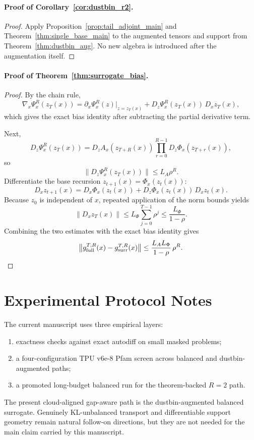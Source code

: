 \documentclass{article}
\begin{document}
\paragraph{Proof of Corollary~\ref{cor:dustbin_r2}.}
\begin{proof}
Apply Proposition~\ref{prop:tail_adjoint_main} and Theorem~\ref{thm:single_base_main} to the augmented tensors and support from Theorem~\ref{thm:dustbin_aug}. No new algebra is introduced after the augmentation itself.
\end{proof}

\paragraph{Proof of Theorem~\ref{thm:surrogate_bias}.}
\begin{proof}
By the chain rule,
\[
\nabla_x\Psi_x^R(z_T(x))
=
\partial_x \Psi_x^R(z)\big|_{z=z_T(x)}
+
D_z\Psi_x^R(z_T(x))\,D_x z_T(x),
\]
which gives the exact bias identity after subtracting the partial derivative term.

Next,
\[
D_z\Psi_x^R(z_T(x))
=
D_z A_x(z_{T+R}(x))
\prod_{r=0}^{R-1} D_z\Phi_x(z_{T+r}(x)),
\]
so
\[
\|D_z\Psi_x^R(z_T(x))\|
\le
L_A \rho^R.
\]
Differentiate the base recursion $z_{t+1}(x)=\Phi_x(z_t(x))$:
\[
D_x z_{t+1}(x)
=
D_x\Phi_x(z_t(x))
+
D_z\Phi_x(z_t(x))\,D_x z_t(x).
\]
Because $z_0$ is independent of $x$, repeated application of the norm bounds yields
\[
\|D_x z_T(x)\|
\le
L_\Phi \sum_{j=0}^{T-1}\rho^j
\le
\frac{L_\Phi}{1-\rho}.
\]
Combining the two estimates with the exact bias identity gives
\[
\bigl\|g_{\mathrm{full}}^{T,R}(x)-g_{\mathrm{surr}}^{T,R}(x)\bigr\|
\le
\frac{L_A L_\Phi}{1-\rho}\,\rho^R.
\qedhere
\]
\end{proof}

\section{Experimental Protocol Notes}

The current manuscript uses three empirical layers:
\begin{enumerate}
    \item exactness checks against exact autodiff on small masked problems;
    \item a four-configuration TPU v6e-8 Pfam screen across balanced and dustbin-augmented paths;
    \item a promoted long-budget balanced run for the theorem-backed $R=2$ path.
\end{enumerate}

The present cloud-aligned gap-aware path is the dustbin-augmented balanced surrogate. Genuinely KL-unbalanced transport and differentiable support geometry remain natural follow-on directions, but they are not needed for the main claim carried by this manuscript.
\end{document}
